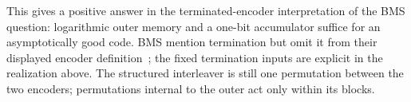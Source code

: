 This gives a positive answer in the terminated-encoder interpretation of
the BMS question: logarithmic outer memory and a one-bit accumulator
suffice for an asymptotically good code. BMS mention termination but
omit it from their displayed encoder definition~\cite[Sec.~I-A]{bms09};
the fixed termination inputs are explicit in the realization above.
The structured interleaver is still one permutation between the two
encoders; permutations internal to the outer act only within its blocks.
